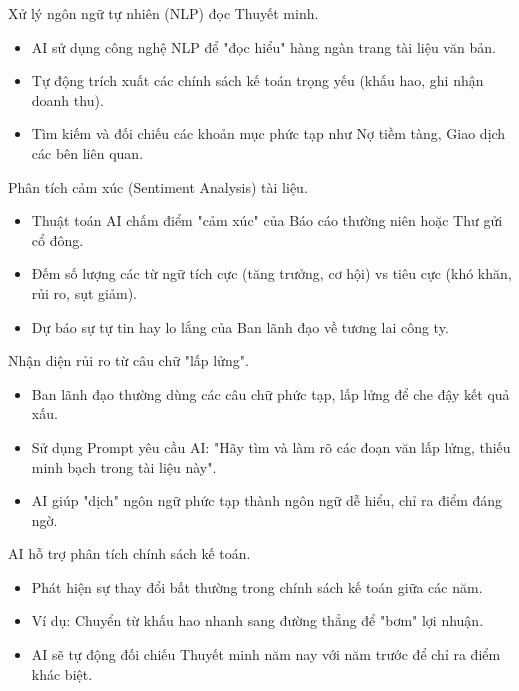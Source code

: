 \documentclass[aspectratio=169]{beamer}
\begin{document}
\begin{frame}{Xử lý ngôn ngữ tự nhiên (NLP) đọc Thuyết minh.}
    \begin{itemize}
        \item AI sử dụng công nghệ NLP để "đọc hiểu" hàng ngàn trang tài liệu văn bản.
        \item Tự động trích xuất các chính sách kế toán trọng yếu (khấu hao, ghi nhận doanh thu).
        \item Tìm kiếm và đối chiếu các khoản mục phức tạp như Nợ tiềm tàng, Giao dịch các bên liên quan.
    \end{itemize}
\end{frame}


\begin{frame}{Phân tích cảm xúc (Sentiment Analysis) tài liệu.}
    \begin{itemize}
        \item Thuật toán AI chấm điểm "cảm xúc" của Báo cáo thường niên hoặc Thư gửi cổ đông.
        \item Đếm số lượng các từ ngữ tích cực (tăng trưởng, cơ hội) vs tiêu cực (khó khăn, rủi ro, sụt giảm).
        \item Dự báo sự tự tin hay lo lắng của Ban lãnh đạo về tương lai công ty.
    \end{itemize}
\end{frame}


\begin{frame}{Nhận diện rủi ro từ câu chữ "lấp lửng".}
    \begin{itemize}
        \item Ban lãnh đạo thường dùng các câu chữ phức tạp, lấp lửng để che đậy kết quả xấu.
        \item Sử dụng Prompt yêu cầu AI: "Hãy tìm và làm rõ các đoạn văn lấp lửng, thiếu minh bạch trong tài liệu này".
        \item AI giúp "dịch" ngôn ngữ phức tạp thành ngôn ngữ dễ hiểu, chỉ ra điểm đáng ngờ.
    \end{itemize}
\end{frame}


\begin{frame}{AI hỗ trợ phân tích chính sách kế toán.}
    \begin{itemize}
        \item Phát hiện sự thay đổi bất thường trong chính sách kế toán giữa các năm.
        \item Ví dụ: Chuyển từ khấu hao nhanh sang đường thẳng để "bơm" lợi nhuận.
        \item AI sẽ tự động đối chiếu Thuyết minh năm nay với năm trước để chỉ ra điểm khác biệt.
    \end{itemize}
\end{frame}
\end{document}
